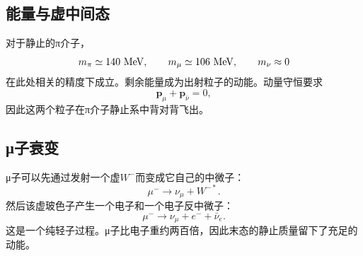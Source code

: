 \begin{classroomqa}
\end{classroomqa}

\subsection{能量与虚中间态}

对于静止的{\proseunicodefont π}介子，
\begin{equation}
m_\pi\simeq140\ {\rm MeV},
\qquad
m_\mu\simeq106\ {\rm MeV},
\qquad
m_\nu\approx0
\end{equation}
在此处相关的精度下成立。剩余能量成为出射粒子的动能。动量守恒要求
\begin{equation}
\boldsymbol p_\mu+\boldsymbol p_{\bar\nu}=0,
\end{equation}
因此这两个粒子在{\proseunicodefont π}介子静止系中背对背飞出。

\begin{classroomqa}
\end{classroomqa}

\subsection{{\proseunicodefont μ}子衰变}

{\proseunicodefont μ}子可以先通过发射一个虚\(W^-\)而变成它自己的中微子：
\begin{equation}
\mu^-\longrightarrow\nu_\mu+W^{-*}.
\end{equation}
然后该虚玻色子产生一个电子和一个电子反中微子：
\begin{equation}
\mu^-\longrightarrow
\nu_\mu+e^-+\bar\nu_e.
\label{eq:l5-muon-decay}
\end{equation}
这是一个纯轻子过程。{\proseunicodefont μ}子比电子重约两百倍，因此末态的静止质量留下了充足的动能。

